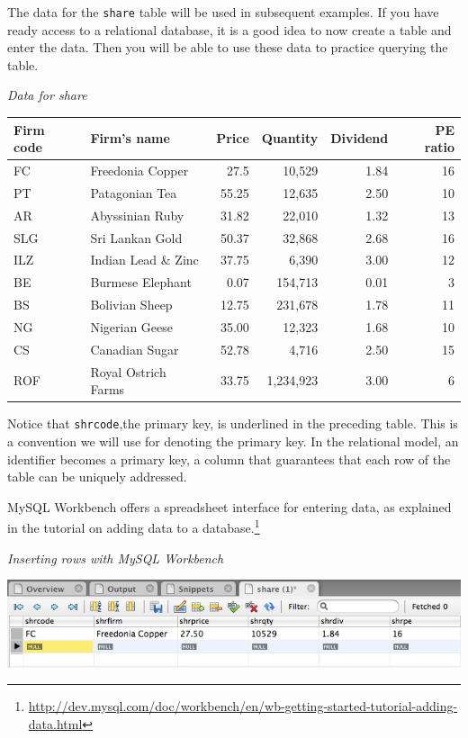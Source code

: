 \documentclass[
]{article}
\begin{document}
The data for the \texttt{share} table will be used in subsequent examples. If you have ready access to a relational database, it is a good idea to now create a table and enter the data. Then you will be able to use these data to practice querying the table.

\emph{Data for share}

\begin{longtable}[]{@{}llrrrr@{}}
\toprule
Firm code & Firm's name & Price & Quantity & Dividend & PE ratio \\
\midrule
\endhead
FC & Freedonia Copper & 27.5 & 10,529 & 1.84 & 16 \\
PT & Patagonian Tea & 55.25 & 12,635 & 2.50 & 10 \\
AR & Abyssinian Ruby & 31.82 & 22,010 & 1.32 & 13 \\
SLG & Sri Lankan Gold & 50.37 & 32,868 & 2.68 & 16 \\
ILZ & Indian Lead \& Zinc & 37.75 & 6,390 & 3.00 & 12 \\
BE & Burmese Elephant & 0.07 & 154,713 & 0.01 & 3 \\
BS & Bolivian Sheep & 12.75 & 231,678 & 1.78 & 11 \\
NG & Nigerian Geese & 35.00 & 12,323 & 1.68 & 10 \\
CS & Canadian Sugar & 52.78 & 4,716 & 2.50 & 15 \\
ROF & Royal Ostrich Farms & 33.75 & 1,234,923 & 3.00 & 6 \\
\bottomrule
\end{longtable}

Notice that \texttt{shrcode},the primary key, is underlined in the preceding table. This is a convention we will use for denoting the primary key. In the relational model, an identifier becomes a primary key, a column that guarantees that each row of the table can be uniquely addressed.

MySQL Workbench offers a spreadsheet interface for entering data, as explained in the tutorial on adding data to a database.\footnote{\url{http://dev.mysql.com/doc/workbench/en/wb-getting-started-tutorial-adding-data.html}}

\emph{Inserting rows with MySQL Workbench}

\includegraphics{Figures/Chapter 3/wb-input.png}
\end{document}
